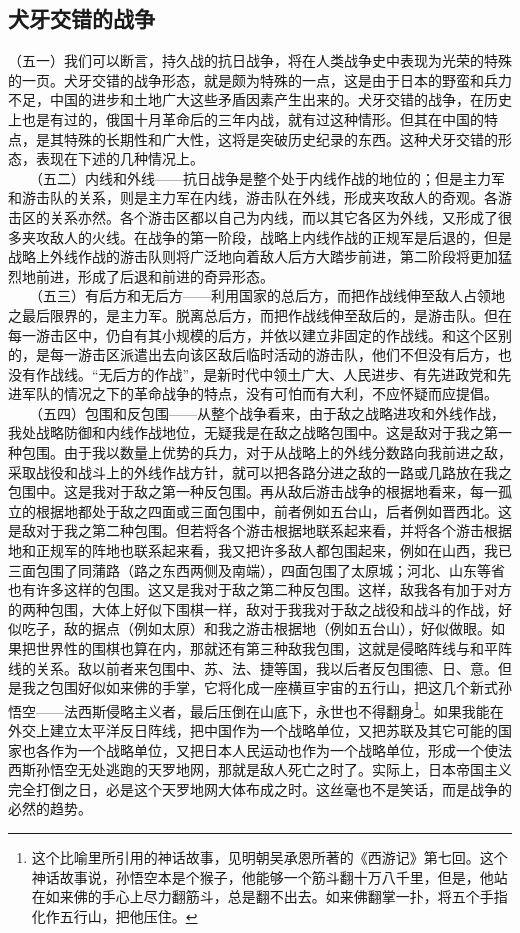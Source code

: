 \documentclass[cn,11pt,chinese]{elegantbook}
\def\myformat#1{\hfil\hfil #1}
\begin{document}
\subsection*{\myformat{犬牙交错的战争}}
（五一）我们可以断言，持久战的抗日战争，将在人类战争史中表现为光荣的特殊的一页。犬牙交错的战争形态，就是颇为特殊的一点，这是由于日本的野蛮和兵力不足，中国的进步和土地广大这些矛盾因素产生出来的。犬牙交错的战争，在历史上也是有过的，俄国十月革命后的三年内战，就有过这种情形。但其在中国的特点，是其特殊的长期性和广大性，这将是突破历史纪录的东西。这种犬牙交错的形态，表现在下述的几种情况上。\\
　　（五二）内线和外线——抗日战争是整个处于内线作战的地位的；但是主力军和游击队的关系，则是主力军在内线，游击队在外线，形成夹攻敌人的奇观。各游击区的关系亦然。各个游击区都以自己为内线，而以其它各区为外线，又形成了很多夹攻敌人的火线。在战争的第一阶段，战略上内线作战的正规军是后退的，但是战略上外线作战的游击队则将广泛地向着敌人后方大踏步前进，第二阶段将更加猛烈地前进，形成了后退和前进的奇异形态。\\
　　（五三）有后方和无后方——利用国家的总后方，而把作战线伸至敌人占领地之最后限界的，是主力军。脱离总后方，而把作战线伸至敌后的，是游击队。但在每一游击区中，仍自有其小规模的后方，并依以建立非固定的作战线。和这个区别的，是每一游击区派遣出去向该区敌后临时活动的游击队，他们不但没有后方，也没有作战线。“无后方的作战”，是新时代中领土广大、人民进步、有先进政党和先进军队的情况之下的革命战争的特点，没有可怕而有大利，不应怀疑而应提倡。\\
　　（五四）包围和反包围——从整个战争看来，由于敌之战略进攻和外线作战，我处战略防御和内线作战地位，无疑我是在敌之战略包围中。这是敌对于我之第一种包围。由于我以数量上优势的兵力，对于从战略上的外线分数路向我前进之敌，采取战役和战斗上的外线作战方针，就可以把各路分进之敌的一路或几路放在我之包围中。这是我对于敌之第一种反包围。再从敌后游击战争的根据地看来，每一孤立的根据地都处于敌之四面或三面包围中，前者例如五台山，后者例如晋西北。这是敌对于我之第二种包围。但若将各个游击根据地联系起来看，并将各个游击根据地和正规军的阵地也联系起来看，我又把许多敌人都包围起来，例如在山西，我已三面包围了同蒲路（路之东西两侧及南端），四面包围了太原城；河北、山东等省也有许多这样的包围。这又是我对于敌之第二种反包围。这样，敌我各有加于对方的两种包围，大体上好似下围棋一样，敌对于我我对于敌之战役和战斗的作战，好似吃子，敌的据点（例如太原）和我之游击根据地（例如五台山），好似做眼。如果把世界性的围棋也算在内，那就还有第三种敌我包围，这就是侵略阵线与和平阵线的关系。敌以前者来包围中、苏、法、捷等国，我以后者反包围德、日、意。但是我之包围好似如来佛的手掌，它将化成一座横亘宇宙的五行山，把这几个新式孙悟空——法西斯侵略主义者，最后压倒在山底下，永世也不得翻身\footnote[19]{ 这个比喻里所引用的神话故事，见明朝吴承恩所著的《西游记》第七回。这个神话故事说，孙悟空本是个猴子，他能够一个筋斗翻十万八千里，但是，他站在如来佛的手心上尽力翻筋斗，总是翻不出去。如来佛翻掌一扑，将五个手指化作五行山，把他压住。}。如果我能在外交上建立太平洋反日阵线，把中国作为一个战略单位，又把苏联及其它可能的国家也各作为一个战略单位，又把日本人民运动也作为一个战略单位，形成一个使法西斯孙悟空无处逃跑的天罗地网，那就是敌人死亡之时了。实际上，日本帝国主义完全打倒之日，必是这个天罗地网大体布成之时。这丝毫也不是笑话，而是战争的必然的趋势。\\
\end{document}
